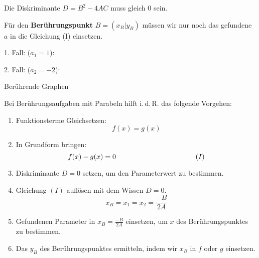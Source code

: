 Die Diskriminante $D=B^2 - 4AC$ muss gleich 0 sein. 

\newpage

Für den \textbf{Berührungspunkt} $B=(x_B|y_B)$ müssen wir nur noch das gefundene
$a$ in die Gleichung (I) einsetzen.





1. Fall: ($a_1=1$):




2. Fall: ($a_2=-2$):


\newpage




\begin{rezept}{Berührende Graphen}{}

  Bei Berührungsaufgaben mit Parabeln hilft i.\,d.\,R. das folgende
  Vorgehen:

  \begin{enumerate}
  \item Funktionsterme Gleichsetzen: $$f(x) = g(x)$$
  \item In Grundform bringen: $$f(x) - g(x) = 0  \hspace{40mm}
    (I)$$
  \item Diskriminante $D = 0 $ setzen, um den Parameterwert zu
    bestimmen.
  \item Gleichung $(I)$ auflösen mit dem Wissen $D=0$.
    $$x_B=x_1=x_2= \frac{-B}{2A}$$

  \item Gefundenen Parameter in $x_B=\frac{-B}{2A}$ einsetzen, um $x$
    des Berührungspunktes zu bestimmen.
  \item Das $y_B$ des Berührungspunktes ermitteln, indem wir $x_B$ in
    $f$ oder $g$ einsetzen.
    \end{enumerate}
\end{rezept}


